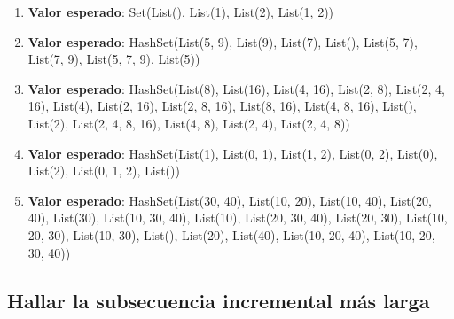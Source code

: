 \documentclass[12pt, a4paper]{article}
\begin{document}
\begin{enumerate}
  \item \textbf{Valor esperado}: Set(List(), List(1), List(2), List(1, 2))
  \item \textbf{Valor esperado}: HashSet(List(5, 9), List(9), List(7), List(), List(5, 7), List(7, 9), List(5, 7, 9), List(5))
  \item \textbf{Valor esperado}: HashSet(List(8), List(16), List(4, 16), List(2, 8), List(2, 4, 16), List(4), List(2, 16), List(2, 8, 16), List(8, 16), List(4, 8, 16), List(), List(2), List(2, 4, 8, 16), List(4, 8), List(2, 4), List(2, 4, 8))
  \item \textbf{Valor esperado}: HashSet(List(1), List(0, 1), List(1, 2), List(0, 2), List(0), List(2), List(0, 1, 2), List())
  \item \textbf{Valor esperado}: HashSet(List(30, 40), List(10, 20), List(10, 40), List(20, 40), List(30), List(10, 30, 40), List(10), List(20, 30, 40), List(20, 30), List(10, 20, 30), List(10, 30), List(), List(20), List(40), List(10, 20, 40), List(10, 20, 30, 40))
\end{enumerate}

\subsection{Hallar la subsecuencia incremental más larga}
\end{document}
